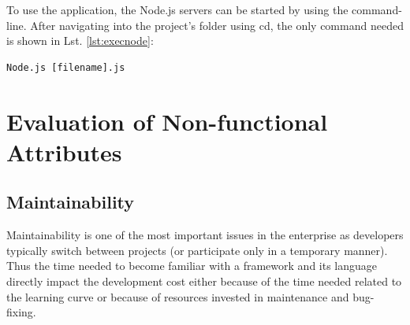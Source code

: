 To use the application, the Node.js servers can be started by using the command-line. After navigating
into the project’s folder using cd, the only command needed is shown in Lst. \ref{lst:execnode}:
\begin{lstlisting}[caption={Executing Node.js code},label=lst:execnode]
Node.js [filename].js
\end{lstlisting}

\newpage
\section{Evaluation of Non-functional Attributes}
\label{evaluation_nonfunctional}

\subsection{Maintainability}
\label{maintainability}
Maintainability is one of the most important issues in the enterprise as
developers typically switch between projects (or participate only in a temporary
manner). Thus the time needed to become familiar with a framework and its
language directly impact the development cost either because of the time needed
related to the learning curve or because of resources invested in maintenance
and bug-fixing.


